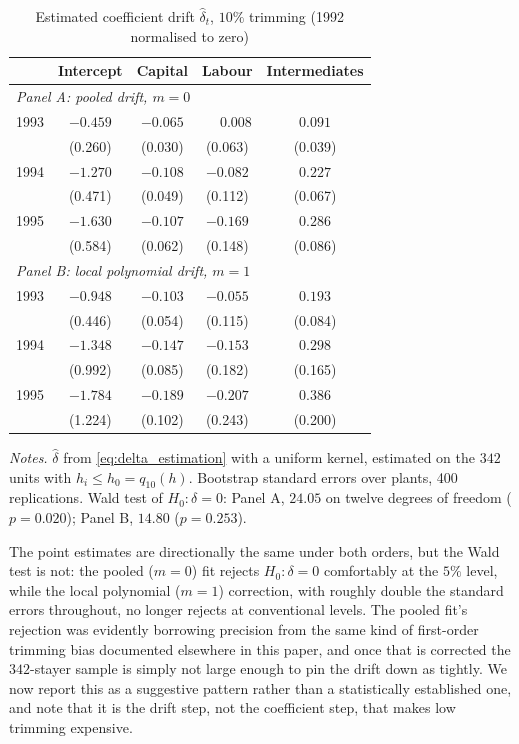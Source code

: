 \documentclass{article}
\begin{document}
\begin{table}[t]
\centering
\caption{Estimated coefficient drift $\hat\delta_t$, $10\%$ trimming
(1992 normalised to zero)}
\label{tab:drift}
\begin{tabular}{lcccc}
\toprule
& Intercept & Capital & Labour & Intermediates \\
\midrule
\multicolumn{5}{l}{\emph{Panel A: pooled drift, $m=0$}} \\
1993 & $-0.459$ & $-0.065$ & $\phantom{-}0.008$ & $0.091$ \\
     & (0.260) & (0.030) & (0.063) & (0.039) \\
1994 & $-1.270$ & $-0.108$ & $-0.082$ & $0.227$ \\
     & (0.471) & (0.049) & (0.112) & (0.067) \\
1995 & $-1.630$ & $-0.107$ & $-0.169$ & $0.286$ \\
     & (0.584) & (0.062) & (0.148) & (0.086) \\
\midrule
\multicolumn{5}{l}{\emph{Panel B: local polynomial drift, $m=1$}} \\
1993 & $-0.948$ & $-0.103$ & $-0.055$ & $0.193$ \\
     & (0.446) & (0.054) & (0.115) & (0.084) \\
1994 & $-1.348$ & $-0.147$ & $-0.153$ & $0.298$ \\
     & (0.992) & (0.085) & (0.182) & (0.165) \\
1995 & $-1.784$ & $-0.189$ & $-0.207$ & $0.386$ \\
     & (1.224) & (0.102) & (0.243) & (0.200) \\
\bottomrule
\end{tabular}

\vspace{0.6em}
\begin{minipage}{0.92\textwidth}
\footnotesize \emph{Notes.} $\hat\delta$ from \eqref{eq:delta_estimation}
with a uniform kernel, estimated on the $342$ units with
$h_i \leq h_0 = q_{10}(h)$. Bootstrap standard errors over plants, 400
replications. Wald test of $H_0:\delta=0$: Panel A, $24.05$ on twelve
degrees of freedom ($p=0.020$); Panel B, $14.80$ ($p=0.253$).
\end{minipage}
\end{table}

The point estimates are directionally the same under both orders, but the
Wald test is not: the pooled ($m=0$) fit rejects $H_0:\delta=0$ comfortably
at the $5\%$ level, while the local polynomial ($m=1$) correction, with
roughly double the standard errors throughout, no longer rejects at
conventional levels. The pooled fit's rejection was evidently borrowing precision from the same kind
of first-order trimming bias documented elsewhere in this paper, and once
that is corrected the $342$-stayer sample is simply not large enough to pin
the drift down as tightly. We now report this as a suggestive
pattern rather than a statistically established one, and note that it is
the drift step, not the coefficient step, that makes low trimming
expensive.
\end{document}
